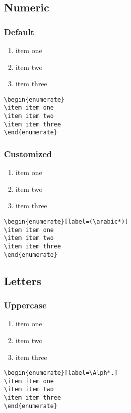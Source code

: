 \documentclass[12pt, letterpaper]{article}
\begin{document}
\subsection{Numeric} 
\subsubsection{Default} 
\begin{enumerate}
	\item item one 
	\item item two
	\item item three
\end{enumerate}
\begin{lstlisting}
\begin{enumerate}
\item item one 
\item item two
\item item three
\end{enumerate}
\end{lstlisting}


\subsubsection{Customized}
\begin{enumerate}[label=(\arabic*)]
		\item item one 
		\item item two
		\item item three
\end{enumerate}
\begin{lstlisting}
\begin{enumerate}[label=(\arabic*)]
\item item one 
\item item two
\item item three
\end{enumerate}
\end{lstlisting}


\subsection{Letters}

\subsubsection{Uppercase}
\begin{enumerate}[label=\Alph*.]
	\item item one 
	\item item two
	\item item three
\end{enumerate}
\begin{lstlisting}
\begin{enumerate}[label=\Alph*.]
\item item one 
\item item two
\item item three
\end{enumerate}
\end{lstlisting}
\end{document}
